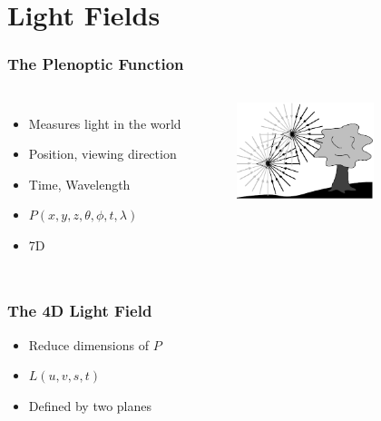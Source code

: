 \documentclass[12pt, compress]{beamer}
\begin{document}
\section{Light Fields}

\begin{frame}[fragile]
	\frametitle{The Plenoptic Function}
	
	\begin{columns}[onlytextwidth]
			\begin{itemize}[<alert@+>]
				\item Measures light in the world
				\item Position, viewing direction
				\item Time, Wavelength
				\item $P(x, y, z, \theta, \phi, t, \lambda)$
				\item 7D
			\end{itemize}
			\begin{figure}
				\captionsetup{font=scriptsize}
				\includegraphics[width = 4cm]{images/plenoptic.png}
				\caption*{\cite{AdelsonBergen}}
			\end{figure}
	\end{columns}
	
\end{frame}

\begin{frame}[fragile]
	\frametitle{The 4D Light Field}
	
	\begin{itemize}[<alert@+>]
		\item Reduce dimensions of $P$
		\item $L(u, v, s, t)$
		\item Defined by two planes
	\end{itemize}
	\begin{center}
	\end{center}
\end{frame}
\end{document}
